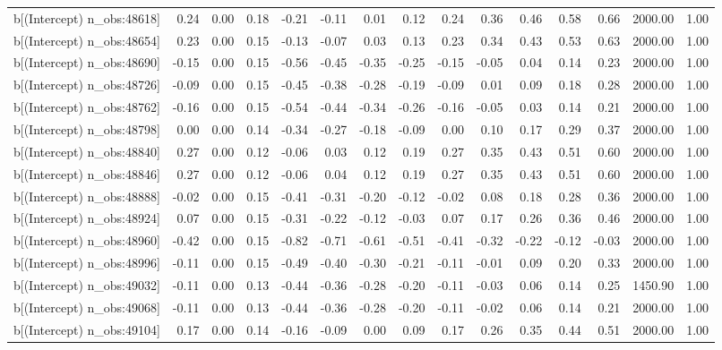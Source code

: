 \begin{table}[ht]
\begin{tabular}{rrrrrrrrrrrrrrr}
  b[(Intercept) n\_obs:48618] & 0.24 & 0.00 & 0.18 & -0.21 & -0.11 & 0.01 & 0.12 & 0.24 & 0.36 & 0.46 & 0.58 & 0.66 & 2000.00 & 1.00 \\ 
  b[(Intercept) n\_obs:48654] & 0.23 & 0.00 & 0.15 & -0.13 & -0.07 & 0.03 & 0.13 & 0.23 & 0.34 & 0.43 & 0.53 & 0.63 & 2000.00 & 1.00 \\ 
  b[(Intercept) n\_obs:48690] & -0.15 & 0.00 & 0.15 & -0.56 & -0.45 & -0.35 & -0.25 & -0.15 & -0.05 & 0.04 & 0.14 & 0.23 & 2000.00 & 1.00 \\ 
  b[(Intercept) n\_obs:48726] & -0.09 & 0.00 & 0.15 & -0.45 & -0.38 & -0.28 & -0.19 & -0.09 & 0.01 & 0.09 & 0.18 & 0.28 & 2000.00 & 1.00 \\ 
  b[(Intercept) n\_obs:48762] & -0.16 & 0.00 & 0.15 & -0.54 & -0.44 & -0.34 & -0.26 & -0.16 & -0.05 & 0.03 & 0.14 & 0.21 & 2000.00 & 1.00 \\ 
  b[(Intercept) n\_obs:48798] & 0.00 & 0.00 & 0.14 & -0.34 & -0.27 & -0.18 & -0.09 & 0.00 & 0.10 & 0.17 & 0.29 & 0.37 & 2000.00 & 1.00 \\ 
  b[(Intercept) n\_obs:48840] & 0.27 & 0.00 & 0.12 & -0.06 & 0.03 & 0.12 & 0.19 & 0.27 & 0.35 & 0.43 & 0.51 & 0.60 & 2000.00 & 1.00 \\ 
  b[(Intercept) n\_obs:48846] & 0.27 & 0.00 & 0.12 & -0.06 & 0.04 & 0.12 & 0.19 & 0.27 & 0.35 & 0.43 & 0.51 & 0.60 & 2000.00 & 1.00 \\ 
  b[(Intercept) n\_obs:48888] & -0.02 & 0.00 & 0.15 & -0.41 & -0.31 & -0.20 & -0.12 & -0.02 & 0.08 & 0.18 & 0.28 & 0.36 & 2000.00 & 1.00 \\ 
  b[(Intercept) n\_obs:48924] & 0.07 & 0.00 & 0.15 & -0.31 & -0.22 & -0.12 & -0.03 & 0.07 & 0.17 & 0.26 & 0.36 & 0.46 & 2000.00 & 1.00 \\ 
  b[(Intercept) n\_obs:48960] & -0.42 & 0.00 & 0.15 & -0.82 & -0.71 & -0.61 & -0.51 & -0.41 & -0.32 & -0.22 & -0.12 & -0.03 & 2000.00 & 1.00 \\ 
  b[(Intercept) n\_obs:48996] & -0.11 & 0.00 & 0.15 & -0.49 & -0.40 & -0.30 & -0.21 & -0.11 & -0.01 & 0.09 & 0.20 & 0.33 & 2000.00 & 1.00 \\ 
  b[(Intercept) n\_obs:49032] & -0.11 & 0.00 & 0.13 & -0.44 & -0.36 & -0.28 & -0.20 & -0.11 & -0.03 & 0.06 & 0.14 & 0.25 & 1450.90 & 1.00 \\ 
  b[(Intercept) n\_obs:49068] & -0.11 & 0.00 & 0.13 & -0.44 & -0.36 & -0.28 & -0.20 & -0.11 & -0.02 & 0.06 & 0.14 & 0.21 & 2000.00 & 1.00 \\ 
  b[(Intercept) n\_obs:49104] & 0.17 & 0.00 & 0.14 & -0.16 & -0.09 & 0.00 & 0.09 & 0.17 & 0.26 & 0.35 & 0.44 & 0.51 & 2000.00 & 1.00 \\ 

\end{tabular}
\end{table}
